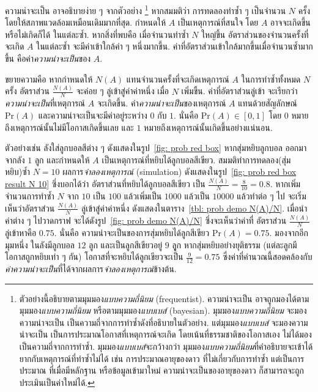 ความน่าจะเป็น อาจอธิบายง่าย ๆ จากตัวอย่าง%
\footnote{%
ตัวอย่างนี้อธิบายตามมุมมอง\textit{แบบความถี่นิยม} (frequentist).
ความน่าจะเป็น อาจถูกมองได้ตามมุมมอง\textit{แบบความถี่นิยม} หรือตามมุมมอง\textit{แบบเบส์} (bayesian).
มุมมอง\textit{แบบความถี่นิยม}
จะมองความน่าจะเป็น เป็นความถี่จากการทำซ้ำดังที่อธิบายในตัวอย่าง.
แต่มุมมอง\textit{แบบเบส์}
จะมองความน่าจะเป็น เป็นการประมาณโอกาสที่เหตุการณ์จะเกิด
โดยเน้นที่ธรรมชาติของโอกาสเอง ไม่ได้มองเป็นความถี่จากการทำซ้ำ.
มุมมอง\textit{แบบเบส์}จะกว้างกว่า มุมมอง\textit{แบบความถี่นิยม}ที่คำอธิบายจะเข้าได้ยากกับเหตุการณ์ที่ทำซ้ำไม่ได้
เช่น การประมาณอายุของดาว
ที่ไม่เกี่ยวกับการทำซ้ำ
แต่เป็นการประมาณ ที่เมื่อมีหลักฐาน หรือข้อมูลเข้ามาใหม่
ความน่าจะเป็นของอายุของดาว ก็สามารถจะถูกประเมินเป็นค่าใหม่ได้.
}
หากสมมติว่า
การทดลองทำซ้ำ ๆ เป็นจำนวน $N$ ครั้ง 
โดยให้สภาพแวดล้อมเหมือนเดิมมากที่สุด.
กำหนดให้ $A$ เป็นเหตุการณ์ที่สนใจ 
โดย $A$ อาจจะเกิดขึ้นหรือไม่เกิดก็ได้ ในแต่ละซ้ำ.
หากสิ่งที่พบคือ
เมื่อจำนวนทำซ้ำ $N$ ใหญ่ขึ้น
อัตราส่วนของจำนวนครั้งที่จะเกิด $A$ ในแต่ละซ้ำ จะมีค่าเข้าใกล้ค่า ๆ หนึ่งมากขึ้น.
ค่าที่อัตราส่วนเข้าใกล้มากขึ้นเมื่อจำนวนซ้ำมากขึ้น
คือค่า\textit{ความน่าจะเป็น}ของ $A$.

ขยายความคือ
หากกำหนดให้ $N(A)$ แทนจำนวนครั้งที่จะเกิดเหตุการณ์ $A$ ในการทำซ้ำทั้งหมด $N$ ครั้ง
อัตราส่วน $\frac{N(A)}{N}$ จะค่อย ๆ ลู่เข้าสู่ค่าค่าหนึ่ง เมื่อ $N$ เพิ่มขึ้น.
ค่าที่อัตราส่วนลู่เข้า 
จะเรียกว่า \textit{ความน่าจะเป็น}ที่เหตุการณ์ $A$ จะเกิดขึ้น.
ค่า\textit{ความน่าจะเป็น}ของเหตุการณ์ $A$ แทนด้วยสัญลักษณ์ $\mathrm{Pr}(A)$
และความน่าจะเป็นจะมีค่าอยู่ระหว่าง $0$ กับ $1$.
นั่นคือ $\mathrm{Pr}(A) \in [0,1]$
โดย $0$ หมายถึงเหตุการณ์นั้นไม่มีโอกาสเกิดขึ้นเลย
และ $1$ หมายถึงเหตุการณ์นั้นเกิดขึ้นอย่างแน่นอน.

ตัวอย่างเช่น ลังใส่ลูกบอลสีต่าง ๆ ดังแสดงในรูป~\ref{fig: prob red box} หากสุ่มหยิบลูกบอล ออกมาจากลัง $1$ ลูก
และกำหนดให้ $A$ เป็นเหตุการณ์ที่หยิบได้ลูกบอลสีเขียว.
สมมติทำการทดลอง(สุ่มหยิบ)ซ้ำ $N = 10$ ผลการ\textit{จำลองเหตุการณ์} (simulation) ดังแสดงในรูป~\ref{fig: prob red box result N 10}
ซึ่งบอกได้ว่า อัตราส่วนที่หยิบได้ลูกบอลสีเขียว เป็น $\frac{N(A)}{N} = \frac{8}{10} = 0.8$.
หากเพิ่มจำนวนการทำซ้ำ $N$ จาก $10$ เป็น $100$ แล้วเพิ่มเป็น $1000$ แล้วเป็น $10000$ แล้วทำต่อ ๆ ไป
จะเริ่มเห็นว่าอัตราส่วน $\frac{N(A)}{N}$ ลู่เข้าสู่ค่าค่าหนึ่ง ดังแสดงในตาราง~\ref{tbl: prob demo N(A)/N}.
เมื่อนำค่าต่าง ๆ ไปวาดกราฟ จะได้ดังรูป~\ref{fig: prob demo N(A)/N} ซึ่งจะเห็นว่าค่าที่ อัตราส่วน $\frac{N(A)}{N}$ ลู่เข้าหาคือ $0.75$.
นั่นคือ ความน่าจะเป็นของการสุ่มหยิบได้ลูกสีเขียว $\mathrm{Pr}(A) = 0.75$.
มองจากอีกมุมหนึ่ง ในลังมีลูกบอล $12$ ลูก 
และเป็นลูกสีเขียวอยู่ $9$ ลุูก หากสุ่มหยิบอย่างยุติธรรม (แต่ละลูกมีโอกาสถูกหยิบเท่า ๆ กัน)  โอกาสที่จะหยิบได้ลูกเขียวจะเป็น $\frac{9}{12} = 0.75$
ซึ่งค่าที่คำนวณนี้สอดคล้องกับ\textit{ค่าความน่าจะเป็น}ที่ได้จากผลการ\textit{จำลองเหตุการณ์}ข้างต้น.

